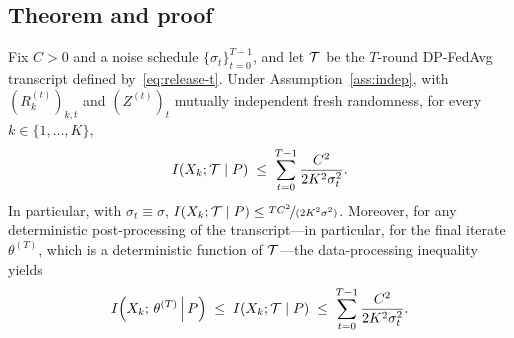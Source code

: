 \subsection{Theorem and proof}

\begin{theorem}\label{thm:multi-round}
Fix \(C>0\) and a noise schedule \(\{\sigma_t\}_{t=0}^{T-1}\), and let \(\mathcal{T}\) be the \(T\)-round DP-FedAvg transcript defined by~\eqref{eq:release-t}. Under Assumption~\ref{ass:indep}, with \((R_k^{(t)})_{k,t}\) and \((Z^{(t)})_t\) mutually independent fresh randomness, for every \(k\in\{1,\dots,K\}\),
\begin{equation}\label{eq:multi-round}
I(X_k;\mathcal{T}\mid P) \;\le\; \sum_{t=0}^{T-1} \frac{C^2}{2K^2\sigma_t^2}.
\end{equation}
In particular, with \(\sigma_t\equiv\sigma\), \(I(X_k;\mathcal{T}\mid P)\le \nicefrac{TC^2}{(2K^2\sigma^2)}\). Moreover, for any deterministic post-processing of the transcript---in particular, for the final iterate \(\theta^{(T)}\), which is a deterministic function of \(\mathcal{T}\)---the data-processing inequality yields
\begin{equation}\label{eq:final-iterate}
    I\!\left(X_k;\,\theta^{(T)}\,\middle|\,P\right) \;\le\; I(X_k;\mathcal{T}\mid P) \;\le\; \sum_{t=0}^{T-1}\frac{C^2}{2K^2\sigma_t^2}.
\end{equation}
\end{theorem}

